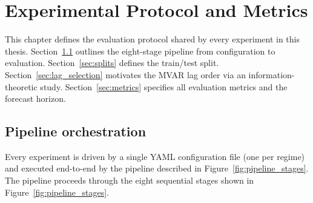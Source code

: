 \chapter{Experimental Protocol and Metrics}
\label{ch:exp_protocol_metrics}

This chapter defines the evaluation protocol shared by every experiment in
this thesis.  Section~\ref{sec:pipeline_orchestration} outlines the
eight-stage pipeline from configuration to evaluation.
Section~\ref{sec:splits} defines the train/test split.
Section~\ref{sec:lag_selection} motivates the MVAR lag order via an
information-theoretic study.
Section~\ref{sec:metrics} specifies all evaluation metrics and the forecast
horizon.

\section{Pipeline orchestration}
\label{sec:pipeline_orchestration}

Every experiment is driven by a single YAML configuration file (one per
regime) and executed end-to-end by the pipeline described in
Figure~\ref{fig:pipeline_stages}.
The pipeline proceeds through the eight sequential stages shown in
Figure~\ref{fig:pipeline_stages}.

